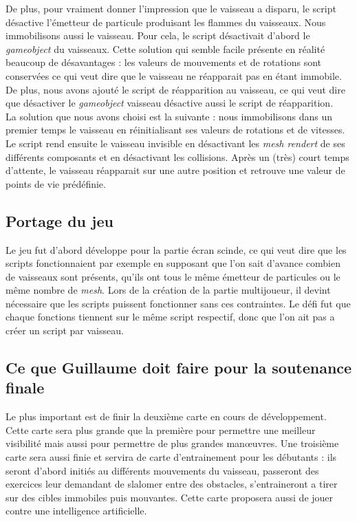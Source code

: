 \documentclass[10pt, titlepage]{report}
\begin{document}
De plus, pour vraiment donner l'impression que le vaisseau a disparu, le script désactive l'émetteur de particule produisant les flammes du vaisseaux. Nous immobilisons aussi le vaisseau. Pour cela, le script désactivait d'abord le \textit{gameobject} du vaisseaux. Cette solution qui semble facile présente en réalité beaucoup de désavantages : les valeurs de mouvements et de rotations sont conservées ce qui veut dire que le vaisseau ne réapparait pas en étant immobile. De plus, nous avons ajouté le script de réapparition au vaisseau, ce qui veut dire que désactiver le \textit{gameobject} vaisseau désactive aussi le script de réapparition.\\

 La solution que nous avons choisi est la suivante : nous immobilisons dans un premier temps le vaisseau en réinitialisant ses valeurs de rotations et de vitesses. Le script  rend ensuite le vaisseau invisible en désactivant les \textit{mesh rendert} de ses différents composants et en désactivant les collisions. Après un (très) court temps d'attente, le vaisseau réapparait sur une autre position et retrouve une valeur de points de vie prédéfinie.\\

\subsection{Portage du jeu}

Le jeu fut d'abord développe pour la partie écran scinde, ce qui veut dire que les scripts fonctionnaient par exemple en supposant que l'on sait d'avance combien de vaisseaux sont présents, qu'ils ont tous le même émetteur de particules  ou le même nombre de \textit{mesh}. Lors de la création de la partie multijoueur, il devint nécessaire que les scripts puissent fonctionner sans ces contraintes. Le défi fut que chaque fonctions tiennent sur le même script respectif, donc que l'on ait pas a créer un script par vaisseau.\\


\subsection{Ce que Guillaume doit faire pour la soutenance finale}

Le plus important est de finir la deuxième carte en cours de développement. Cette carte sera plus grande que la première pour permettre une meilleur visibilité mais aussi pour permettre de plus grandes manœuvres. Une troisième carte sera aussi finie et servira de  carte d'entrainement pour les débutants : ils seront d'abord initiés au différents mouvements du vaisseau, passeront des exercices leur demandant de slalomer entre des obstacles, s'entraineront a tirer sur des cibles immobiles puis mouvantes. Cette carte proposera aussi de jouer contre une intelligence artificielle.\\
\end{document}
